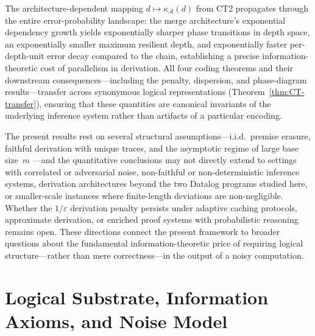 \documentclass[journal]{IEEEtran}
\numberwithin{equation}{section}
\begin{document}
The architecture-dependent mapping
$d\mapsto\kappa_{\mathcal A}(d)$ from CT2 propagates through the
entire error-probability landscape: the merge architecture's
exponential dependency growth yields exponentially sharper phase
transitions in depth space, an exponentially smaller maximum
resilient depth, and exponentially faster per-depth-unit error
decay compared to the chain, establishing a precise
information-theoretic cost of parallelism in derivation.
All four coding theorems and their downstream
consequences---including the penalty, dispersion, and
phase-diagram results---transfer across synonymous logical
representations (Theorem~\ref{thm:CT-transfer}), ensuring that
these quantities are canonical invariants of the underlying
inference system rather than artifacts of a particular encoding.

The present results rest on several structural
assumptions---i.i.d.\ premise erasure, faithful derivation with
unique traces, and the asymptotic regime of large base size~$m$%
---and the quantitative conclusions may not directly extend to
settings with correlated or adversarial noise, non-faithful or
non-deterministic inference systems, derivation architectures
beyond the two Datalog programs studied here, or smaller-scale
instances where finite-length deviations are non-negligible.
Whether the $1/\varepsilon$ derivation penalty persists under
adaptive caching protocols, approximate derivation, or enriched
proof systems with probabilistic reasoning remains open.
These directions connect the present framework to broader
questions about the fundamental information-theoretic price of
requiring logical structure---rather than mere correctness---in
the output of a noisy computation.

\appendices



\section{Logical Substrate, Information Axioms, and Noise Model}
\label{sec:substrate}
\end{document}
